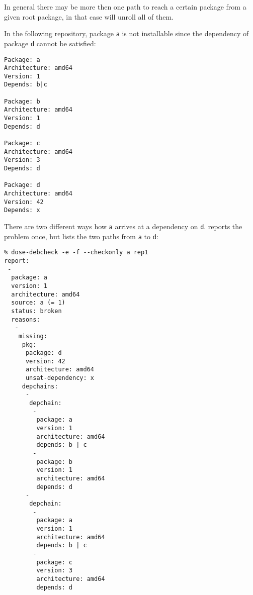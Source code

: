 In general there may be more then one path to reach a certain package
from a given root package, in that case \debcheck{} will unroll all of
them.
\begin{example}
In the following repository, package \texttt{a} is not installable since 
the dependency of package \texttt{d} cannot be satisfied:
\begin{verbatim}
Package: a
Architecture: amd64
Version: 1
Depends: b|c

Package: b
Architecture: amd64
Version: 1
Depends: d

Package: c
Architecture: amd64
Version: 3
Depends: d

Package: d
Architecture: amd64
Version: 42
Depends: x
\end{verbatim}
There are two different ways how \texttt{a} arrives at a dependency on
\texttt{d}. \debcheck{} reports the problem once, but lists the two paths 
from \texttt{a} to \texttt{d}:
\begin{verbatim}
% dose-debcheck -e -f --checkonly a rep1
report:
 -
  package: a
  version: 1
  architecture: amd64
  source: a (= 1)
  status: broken
  reasons:
   -
    missing:
     pkg:
      package: d
      version: 42
      architecture: amd64
      unsat-dependency: x
     depchains:
      -
       depchain:
        -
         package: a
         version: 1
         architecture: amd64
         depends: b | c
        -
         package: b
         version: 1
         architecture: amd64
         depends: d
      -
       depchain:
        -
         package: a
         version: 1
         architecture: amd64
         depends: b | c
        -
         package: c
         version: 3
         architecture: amd64
         depends: d
\end{verbatim}
\end{example}


